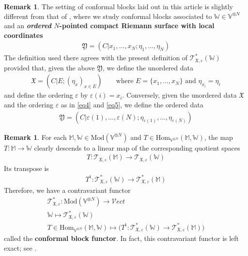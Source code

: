 \documentclass[11pt,b5paper,notitlepage]{article}
\theoremstyle{definition}
\newtheorem{rem}[df]{Remark}
\theoremstyle{plain}
\newcommand{\tr}{\mathrm{t}} %
\newcommand{\Hom}{\mathrm{Hom}}
\newcommand{\Vect}{\mathcal Vect}
\newcommand{\Vbb}{\mathbb V}
\newcommand{\Wbb}{\mathbb W}
\newcommand{\Mbb}{\mathbb M}
\newcommand{\<}{\left\langle}
\renewcommand{\>}{\right\rangle}
\newcommand{\fx}{\mathfrak{X}}
\newcommand{\ST}{\mathscr{T}}
\newcommand{\Mod}{\mathrm{Mod}}
\newcommand{\eps}{\varepsilon}
\newcommand{\fy}{\mathfrak{Y}}
\numberwithin{equation}{section}
\begin{document}
\begin{rem}
The setting of conformal blocks laid out in this article is slightly different from that of \cite{GZ1,GZ2,GZ3}, where we study conformal blocks associated to $\Wbb\in\Vbb^{\otimes N}$ and an \textbf{\textit{ordered} $N$-pointed compact Riemann surface with local coordinates}
\begin{align*}
\fy=(C|x_1,\dots,x_N;\eta_1,\dots,\eta_N)
\end{align*}
The definition used there agrees with the present definition of $\ST^*_{\fx,\eps}(\Wbb)$ provided that, given the above $\fy$, we define  the unordered data
\begin{align*}
\fx=(C|E;(\eta_x)_{x\in E})\qquad\text{where }E=\{x_1,\dots,x_N\}\text{ and }\eta_{x_i}=\eta_i
\end{align*}
and define the ordering $\eps$ by $\eps(i)=x_i$. Conversely, given the unordered data $\fx$ and the ordering $\eps$ as in \eqref{eq4} and \eqref{eq5}, we define the ordered data
\begin{align*}
\fy=(C|\eps(1),\dots,\eps(N);\eta_{\eps(1)},\dots,\eta_{\eps(N)})
\end{align*}
\end{rem}
	 

\begin{rem}\label{lb38}
For each $\Mbb,\Wbb\in\Mod(\Vbb^{\otimes N})$ and $T\in\Hom_{\Vbb^{\otimes N}}(\Mbb,\Wbb)$, the map $T:\Mbb\rightarrow\Wbb$ clearly descends to a linear map of the corresponding quotient spaces
\begin{align}
T:\ST_{\fx,\eps}(\Mbb)\longrightarrow\ST_{\fx,\eps}(\Wbb)
\end{align}
Its transpose is
\begin{align}
T^\tr:\ST^*_{\fx,\eps}(\Wbb)\longrightarrow\ST^*_{\fx,\eps}(\Mbb)
\end{align}
Therefore, we have a contravariant functor
\begin{gather*}
\ST^*_{\fx,\eps}:\Mod(\Vbb^{\otimes N})\longrightarrow \Vect\\
\Wbb\longmapsto \ST^*_{\fx,\eps}(\Wbb)\\
T\in\Hom_{\Vbb^{\otimes N}}(\Mbb,\Wbb)\longmapsto\big(T^\tr:\ST^*_{\fx,\eps}(\Wbb)\rightarrow\ST^*_{\fx,\eps}(\Mbb)\big)
\end{gather*}
called the \textbf{conformal block functor}. In fact, this contravariant functor is left exact; see \cite[Thm. 1.22]{GZ3}.
\end{rem}
\end{document}
